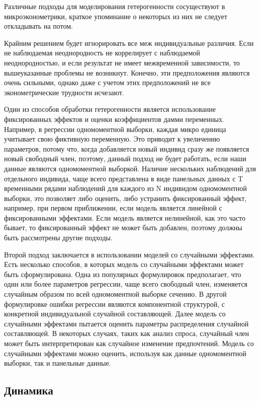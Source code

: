 	
	Различные подходы для моделирования гетерогенности сосуществуют в микроэконометрики, краткое упоминание о некоторых из них не следует откладывать на потом.
	
	
	Крайним решением будет игнорировать все меж индивидуальные различия. Если не наблюдаемая неоднородность не коррелирует с наблюдаемой неоднородностью, и если результат не имеет межвременной зависимости, то вышеуказанные проблемы не возникнут. Конечно, эти  предположения являются очень сильными, однако даже с учетом этих предположений не все эконометрические трудности исчезают.
	
	
	Один из способов обработки гетерогенности является использование фиксированных эффектов и оценки коэффициентов дамми переменных. Например, в регрессии одномоментной выборки, каждая микро единица учитывает свою фиктивную переменную. Это приводит к увеличению параметров, потому что, когда добавляется новый индивид сразу же появляется новый свободный член, поэтому, данный подход не будет работать, если наши данные являются одномоментной выборкой. Наличие нескольких наблюдений для отдельного индивида, чаще всего представлена в виде панельных данных с T временными рядами наблюдений для каждого из N индивидом одномоментной выборки, это позволяет либо оценить, либо устранить фиксированный эффект, например,  при первом приближении, если модель является линейной с фиксированными эффектами. Если модель является нелинейной, как это часто бывает, то фиксированный эффект не может быть добавлен, поэтому должны быть рассмотрены другие подходы.
	
	
	Второй подход заключается в использовании моделей со случайными эффектами. Есть несколько способов, в которых модель со случайными эффектами может быть сформулирована. Одна из популярных формулировок предполагает, что один или более параметров регрессии, чаще всего свободный член, изменяется случайным образом по всей одномоментной выборке сечению. В другой формулировке ошибки регрессии являются компонентной структурой, с конкретной индивидуальной  случайной составляющей. Далее модель со случайными эффектами пытается оценить параметры распределения случайной составляющей. В некоторых случаях, таких как анализ спроса, случайный член может быть интерпретирован как случайное изменение предпочтений. Модель со случайными эффектами можно оценить, используя как данные одномоментной выборки, так и панельные данные.
	

\subsection{Динамика}

